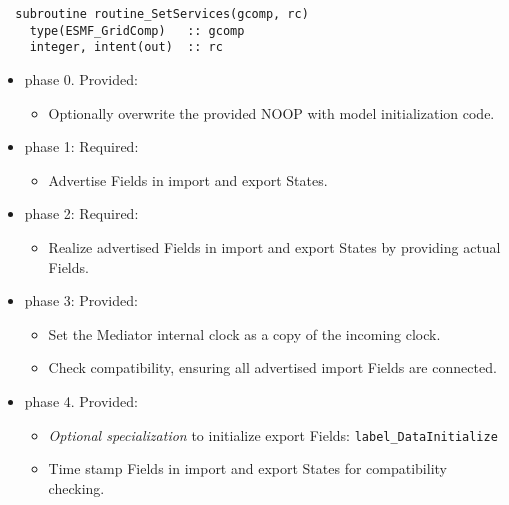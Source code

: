 \begin{verbatim}  subroutine routine_SetServices(gcomp, rc)
    type(ESMF_GridComp)   :: gcomp
    integer, intent(out)  :: rc
\end{verbatim}

\begin{itemize}
\item phase 0. {\sc Provided:}
  \begin{itemize}
  \item Optionally overwrite the provided NOOP with model initialization code.
  \end{itemize}  
\item phase 1: {\sc Required:} 
  \begin{itemize}
  \item Advertise Fields in import and export States.
  \end{itemize}
\item phase 2: {\sc Required:}
  \begin{itemize}
  \item Realize advertised Fields in import and export States by providing actual Fields.
  \end{itemize}  
\item phase 3: {\sc Provided:}
  \begin{itemize}
  \item Set the Mediator internal clock as a copy of the incoming clock. 
  \item Check compatibility, ensuring all advertised import Fields are connected.
  \end{itemize}  
\item phase 4. {\sc Provided:}
  \begin{itemize}
  \item {\it Optional specialization} to initialize export Fields: {\tt label\_DataInitialize}
  \item Time stamp Fields in import and export States for compatibility checking.
  \end{itemize}    
\end{itemize}

